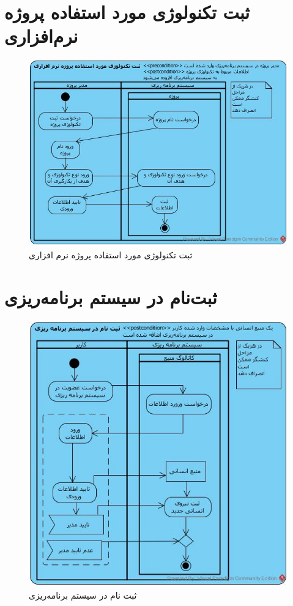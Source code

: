 \section{ثبت تکنولوژی مورد استفاده پروژه نرم‌افزاری}
\begin{figure}[H]
	\centering
	\includegraphics[scale=0.7]{img/activity/AddTechnology}
	\caption{ثبت تکنولوژی مورد استفاده پروژه نرم افزاری}
\end{figure}

\section{ثبت‌نام در سیستم برنامه‌ریزی}
\begin{figure}[H]
	\centering
	\includegraphics[scale=0.8]{img/activity/SignUp}
	\caption{ثبت نام در سیستم برنامه‌ریزی}
\end{figure}

